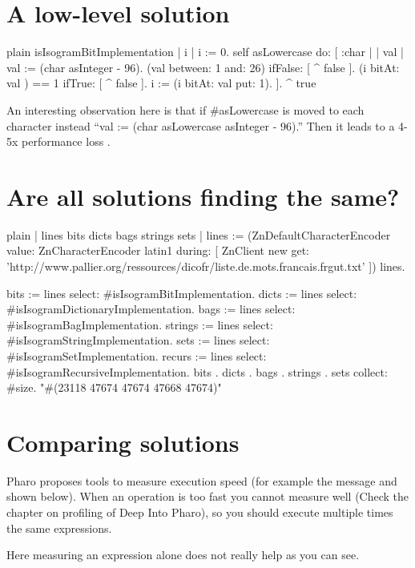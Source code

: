 \documentclass[10pt,twoside,english]{_support/latex/sbabook/sbabook}
\begin{document}
\section{A low-level solution}
\begin{displaycode}{plain}
isIsogramBitImplementation
   | i |
   i := 0.
   self asLowercase do: [ :char |
         | val |
         val := (char asInteger - 96).
         (val between: 1 and: 26) ifFalse: [ ^ false ].
         (i bitAt: val ) == 1 ifTrue: [ ^ false ].
         i := (i bitAt: val put: 1).
         ].
     ^ true
\end{displaycode}

 

 

An interesting observation here is that if \#asLowercase is moved to  each character instead “val := (char asLowercase  asInteger - 96).” Then it leads to a 4-5x performance loss .
\section{Are all solutions finding the same?}
\begin{displaycode}{plain}
	| lines bits dicts  bags strings sets |
	lines := (ZnDefaultCharacterEncoder 
	  value: ZnCharacterEncoder latin1 
	  during: [
	    ZnClient new 
	      get: 'http://www.pallier.org/ressources/dicofr/liste.de.mots.francais.frgut.txt' ]) lines.

	bits := lines select: #isIsogramBitImplementation. 
	dicts := lines select: #isIsogramDictionaryImplementation. 
	bags := lines select: #isIsogramBagImplementation.
	strings := lines select: #isIsogramStringImplementation.
	sets := lines select: #isIsogramSetImplementation.
	recurs := lines select: #isIsogramRecursiveImplementation.
	{ bits . dicts .  bags . strings . sets} collect: #size. "#(23118 47674 47674 47668 47674)"
\end{displaycode}
\section{Comparing solutions}
Pharo proposes tools to measure execution speed (for example the message  and  shown below).  When an operation is too fast you cannot measure well (Check the chapter on profiling of Deep Into Pharo), so you should execute multiple times the same expressions.  

Here measuring an expression alone does not really help as you can see. 
\end{document}
